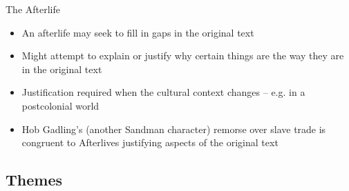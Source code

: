 \documentclass{beamer}
\begin{document}
  
  \begin{frame}{The Afterlife}
    \begin{itemize}
  \item An afterlife may seek to fill in gaps in the original text
  \item Might attempt to explain or justify why certain things are the way they are in the original text
  \item Justification required when the cultural context changes -- e.g. in a postcolonial world
  \item Hob Gadling's (another Sandman character) remorse over slave trade is congruent to Afterlives justifying aspects of the original text
    \end{itemize}
  \end{frame}
  
  \subsection{Themes}
\end{document}
